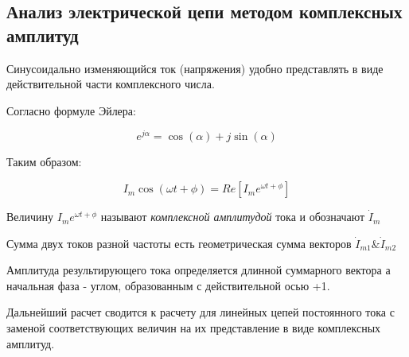 \subsection{Анализ электрической цепи методом комплексных амплитуд}

Синусоидально изменяющийся ток (напряжения) удобно представлять в виде действительной части комплексного числа.

Согласно формуле Эйлера:

\begin{equation}
e^{j \alpha} = \cos(\alpha) + j \sin(\alpha)
\end{equation}

Таким образом:


\begin{equation}
 I_m \cos (\omega t + \phi ) = Re[I_m e^{\omega t + \phi}]
\end{equation}

Величину $I_m e^{\omega t + \phi}$ называют \textit{комплексной амплитудой } тока и обозначают $\dot I_m$

Сумма двух токов разной частоты есть геометрическая сумма векторов $\dot I_{m1} \& \dot I_{m2}$

Амплитуда результирующего тока определяется длинной суммарного вектора а начальная фаза - углом, образованным с действительной осью +1.

Дальнейший расчет сводится к расчету для линейных цепей постоянного тока с заменой соответствующих величин на их представление в виде комплексных амплитуд.

\pagebreak